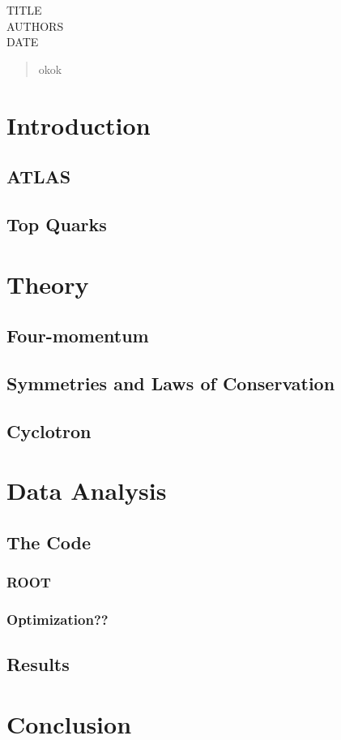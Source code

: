 \documentclass[11pt,a4paper]{article}
\begin{document}
TITLE\\
AUTHORS\\
DATE

\cleardoublepage{}
\begin{abstract}
  okok
\end{abstract}
\cleardoublepage{}
\tableofcontents{}
\section{Introduction}

\subsection{ATLAS}

\subsection{Top Quarks}

\section{Theory}

\subsection{Four-momentum}

\subsection{Symmetries and Laws of Conservation}

\subsection{Cyclotron}

\section{Data Analysis}

\subsection{The Code}

\subsubsection{ROOT}

\subsubsection{Optimization??}

\subsection{Results}

\section{Conclusion}
\end{document}

